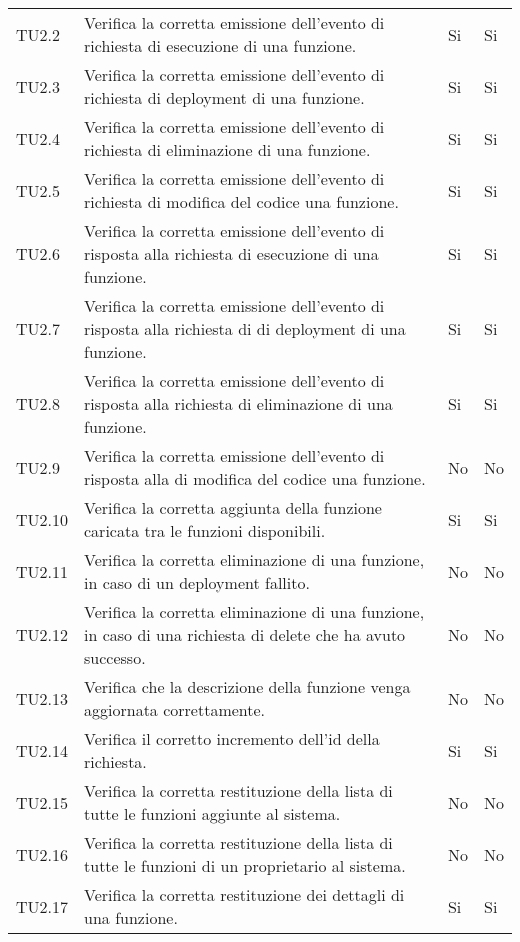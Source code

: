 \begin{longtable}{
		>{\centering}p{}
		>{}p{}
		>{\centering}p{}
		>{\centering}p{} }
TU2.2   &  Verifica la corretta emissione dell'evento di richiesta di esecuzione di una funzione. &
Si & Si \tabularnewline

TU2.3   &  Verifica la corretta emissione dell'evento di richiesta di deployment di una funzione. &
Si & Si \tabularnewline

TU2.4   &  Verifica la corretta emissione dell'evento di richiesta di eliminazione di una funzione. &
Si & Si \tabularnewline

TU2.5   &  Verifica la corretta emissione dell'evento di richiesta di modifica del codice una funzione. &
Si & Si \tabularnewline

TU2.6   &  Verifica la corretta emissione dell'evento di risposta alla richiesta di esecuzione di una funzione. &
Si & Si \tabularnewline

TU2.7   &  Verifica la corretta emissione dell'evento di risposta alla richiesta di di deployment di una funzione. &
Si & Si \tabularnewline

TU2.8   &  Verifica la corretta emissione dell'evento di risposta alla richiesta di eliminazione di una funzione. &
Si & Si \tabularnewline

TU2.9   &  Verifica la corretta emissione dell'evento di risposta alla di modifica del codice una funzione. &
No & No \tabularnewline

TU2.10  &  Verifica la corretta aggiunta della funzione caricata tra le funzioni disponibili. &
Si & Si \tabularnewline

TU2.11  &  Verifica la corretta eliminazione di una funzione, in caso di un deployment fallito. &
No & No \tabularnewline

TU2.12  &  Verifica la corretta eliminazione di una funzione, in caso di una richiesta di delete che ha avuto successo. &
No & No \tabularnewline

TU2.13  &  Verifica che la descrizione della funzione venga aggiornata correttamente. &
No & No \tabularnewline

TU2.14  &  Verifica il corretto incremento dell'id della richiesta. &
Si & Si \tabularnewline

TU2.15  &  Verifica la corretta restituzione della lista di tutte le funzioni aggiunte al sistema. &
No & No \tabularnewline

TU2.16  &  Verifica la corretta restituzione della lista di tutte le funzioni di un proprietario al sistema. &
No & No \tabularnewline

TU2.17  &  Verifica la corretta restituzione dei dettagli di una funzione. &
Si & Si \tabularnewline


\end{longtable}
